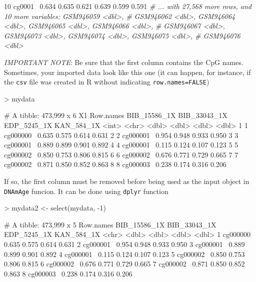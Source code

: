 \documentclass[]{article}
\newcommand{\hlnum}[1]{\textcolor[rgb]{0.816,0.125,0.439}{#1}}%
\newcommand{\hlstr}[1]{\textcolor[rgb]{0.251,0.627,0.251}{#1}}%
\newcommand{\hlcom}[1]{\textcolor[rgb]{0.502,0.502,0.502}{\textit{#1}}}%
\newcommand{\hlopt}[1]{\textcolor[rgb]{0,0,0}{#1}}%
\newcommand{\hlstd}[1]{\textcolor[rgb]{0.251,0.251,0.251}{#1}}%
\newenvironment{Shaded}{\begin{myshaded}}{\end{myshaded}}
\renewenvironment{verbatim}{\color{codecolor}\begin{myshaded}\begin{oldverbatim}}{\end{oldverbatim}\end{myshaded}}
\newcommand{\DecValTok}[1]{\hlnum{#1}}
\newcommand{\FloatTok}[1]{\hlnum{#1}}
\newcommand{\StringTok}[1]{\hlstr{#1}}
\newcommand{\CommentTok}[1]{\hlcom{#1}}
\newcommand{\OperatorTok}[1]{\hlopt{#1}}
\newcommand{\NormalTok}[1]{\hlstd{#1}}
\begin{document}
\begin{Shaded}
\begin{Highlighting}[]
  \DecValTok{10}\NormalTok{ cg0001}\OperatorTok{~}\StringTok{    }\FloatTok{0.634}    \FloatTok{0.635}     \FloatTok{0.621}     \FloatTok{0.639}     \FloatTok{0.599}     \FloatTok{0.591}  
  \CommentTok{# ... with 27,568 more rows, and 10 more variables: GSM946059 <dbl>,}
  \CommentTok{#   GSM946062 <dbl>, GSM946064 <dbl>, GSM946065 <dbl>, GSM946066 <dbl>,}
  \CommentTok{#   GSM946067 <dbl>, GSM946073 <dbl>, GSM946074 <dbl>, GSM946075 <dbl>,}
  \CommentTok{#   GSM946076 <dbl>}
\end{Highlighting}
\end{Shaded}

\emph{IMPORTANT NOTE}: Be sure that the first column contains the CpG names. Sometimes, your imported data look like this one (it can happen, for instance, if the \texttt{csv} file was created in R without indicating \texttt{row.names=FALSE})

\begin{verbatim}
> mydata

# A tibble: 473,999 x 6
      X1 Row.names BIB_15586_1X BIB_33043_1X EDP_5245_1X KAN_584_1X 
   <int> <chr>            <dbl>        <dbl>       <dbl>      <dbl>     
 1     1 cg000000~       0.635        0.575       0.614      0.631     
 2     2 cg000001~       0.954        0.948       0.933      0.950     
 3     3 cg000001~       0.889        0.899       0.901      0.892     
 4     4 cg000001~       0.115        0.124       0.107      0.123     
 5     5 cg000002~       0.850        0.753       0.806      0.815     
 6     6 cg000002~       0.676        0.771       0.729      0.665     
 7     7 cg000002~       0.871        0.850       0.852      0.863     
 8     8 cg000003~       0.238        0.174       0.316      0.206
\end{verbatim}

If so, the first column must be removed before being used as the input object in \texttt{DNAmAge} funcion. It can be done using \texttt{dplyr} function

\begin{verbatim}
> mydata2 <- select(mydata, -1)

# A tibble: 473,999 x 5
      Row.names BIB_15586_1X BIB_33043_1X EDP_5245_1X KAN_584_1X 
    <chr>            <dbl>        <dbl>       <dbl>      <dbl>     
 1    cg000000~       0.635        0.575       0.614      0.631     
 2    cg000001~       0.954        0.948       0.933      0.950     
 3    cg000001~       0.889        0.899       0.901      0.892     
 4    cg000001~       0.115        0.124       0.107      0.123     
 5    cg000002~       0.850        0.753       0.806      0.815     
 6    cg000002~       0.676        0.771       0.729      0.665     
 7    cg000002~       0.871        0.850       0.852      0.863     
 8    cg000003~       0.238        0.174       0.316      0.206
\end{verbatim}
\end{document}
